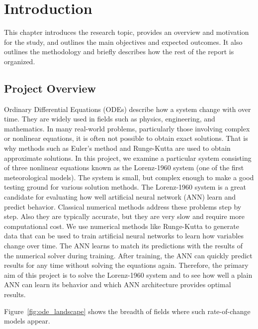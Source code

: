 \chapter{Introduction}

This chapter introduces the research topic, provides an overview and motivation for the study, and outlines the main objectives and expected outcomes. It also outlines the methodology and briefly describes how the rest of the report is organized.

\section{Project Overview}
Ordinary Differential Equations (ODEs) describe how a system change with over time. They are widely used in fields such as physics, engineering, and mathematics. In many 
real-world problems, particularly those involving complex or nonlinear equations, it is often 
not possible to obtain exact solutions. That is why methods such as Euler’s method and 
Runge-Kutta are used to obtain approximate solutions. In this project, we examine a 
particular system consisting of three nonlinear equations known as the Lorenz-1960 system 
(one of the first meteorological models). The system is small, but complex enough to 
make a good testing ground for various solution methods. The Lorenz-1960 system is a 
great candidate for evaluating how well  artificial neural network (ANN) learn and predict behavior. Classical 
numerical methods address these problems step by step. Also they are typically accurate, but 
they are very slow and require more computational cost. We use numerical methods like Runge-Kutta to generate data that can be used to train artificial neural networks to learn how variables change over time.
The ANN learns to match its predictions with the results of the numerical solver during training. After training, the ANN can quickly predict results for any time without solving the equations again.
Therefore, the primary aim  of this project is to solve the Lorenz-1960 system 
and to see how well a plain ANN can learn its behavior and which ANN architecture provides
optimal results. 


Figure~\ref{fig:ode_landscape} shows the breadth of fields where such rate-of-change models appear.

